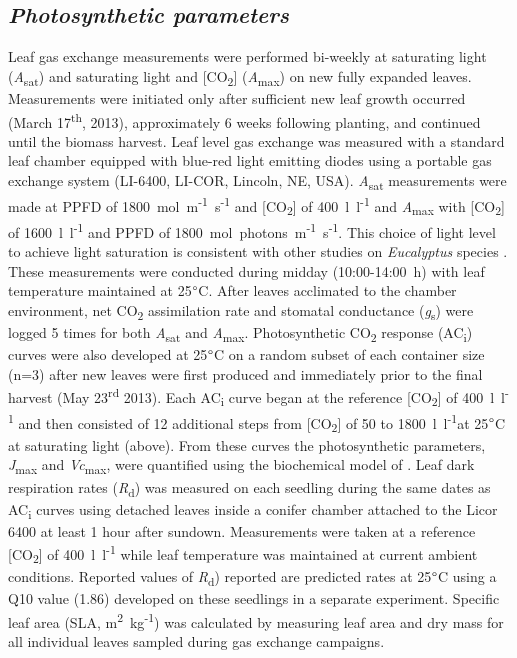 \documentclass[a4paper]{article}\usepackage[]{graphicx}\usepackage[]{color}
\begin{document}
\subsection*{\textit{Photosynthetic parameters}}
Leaf gas exchange measurements were performed bi-weekly at saturating light (\textit{A}\textsubscript{sat}) and saturating light and [CO\textsubscript{2}] (\textit{A}\textsubscript{max}) on new fully expanded leaves. Measurements were initiated only after sufficient new leaf growth occurred (March 17\textsuperscript{th}, 2013), approximately 6 weeks following planting, and continued until the biomass harvest. Leaf level gas exchange was measured with a standard leaf chamber equipped with blue-red light emitting diodes using a portable gas exchange system (LI-6400, LI-COR, Lincoln, NE, USA). \textit{A}\textsubscript{sat} measurements were made at PPFD of 1800~{\textmugreek}mol~m\textsuperscript{-1}~s\textsuperscript{-1} and [CO\textsubscript{2}] of 400~{\textmugreek}l~l\textsuperscript{-1} and \textit{A}\textsubscript{max} with [CO\textsubscript{2}] of 1600~{\textmugreek}l~l\textsuperscript{-1} and PPFD of 1800~{\textmugreek}mol~photons~m\textsuperscript{-1}~s\textsuperscript{-1}. This choice of light level to achieve light saturation is consistent with other studies on \textit{Eucalyptus} species \citep{kallarackal1997ecophysiological,pinkard1998photosynthetic,crous2013photosynthesis,drake2014capacity}. These measurements were conducted during midday (10:00-14:00~h) with leaf temperature maintained at 25$\degree$C. After leaves acclimated to the chamber environment, net CO\textsubscript{2} assimilation rate and stomatal conductance (\textit{g}\textsubscript{s}) were logged 5 times for both \textit{A}\textsubscript{sat} and \textit{A}\textsubscript{max}. Photosynthetic CO\textsubscript{2} response (AC\textsubscript{i}) curves were also developed at 25$\degree$C on a random subset of each container size (n=3) after new leaves were first produced and immediately prior to the final harvest (May 23\textsuperscript{rd} 2013). Each AC\textsubscript{i} curve began at the reference [CO\textsubscript{2}] of 400~{\textmugreek}l~l\textsuperscript{-1} and then consisted of 12 additional steps from [CO\textsubscript{2}] of 50 to 1800~{\textmugreek}l~l\textsuperscript{-1}at 25$\degree$C at saturating light (above). From these curves the photosynthetic parameters, \textit{J}\textsubscript{max} and \textit{Vc}\textsubscript{max}, were quantified using the biochemical model of \citet{farquhar1980biochemical}. Leaf dark respiration rates (\textit{R}\textsubscript{d}) was measured on each seedling during the same dates as AC\textsubscript{i} curves using detached leaves inside a conifer chamber attached to the Licor 6400 at least 1 hour after sundown.   Measurements were taken at a reference [CO\textsubscript{2}] of 400~{\textmugreek}l~l\textsuperscript{-1} while leaf temperature was maintained at current ambient conditions. Reported values of \textit{R}\textsubscript{d}) reported are predicted rates at 25$\degree$C using a Q10 value (1.86) developed on these seedlings in a separate experiment. Specific leaf area (SLA, m\textsuperscript{2}~kg\textsuperscript{-1}) was calculated by measuring leaf area and dry mass for all individual leaves sampled during gas exchange campaigns.
\end{document}
